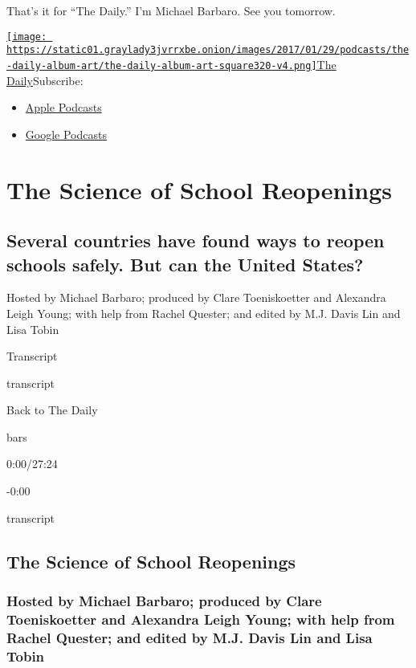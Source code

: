 That's it for ``The Daily.'' I'm Michael Barbaro. See you tomorrow.

\href{https://www.nytimes3xbfgragh.onion/column/the-daily}{\texttt{[image: https://static01.graylady3jvrrxbe.onion/images/2017/01/29/podcasts/the-daily-album-art/the-daily-album-art-square320-v4.png]}The
Daily}Subscribe:

\begin{itemize}
\tightlist
\item
  \href{https://itunes.apple.com/us/podcast/id1200361736}{Apple
  Podcasts}
\item
  \href{https://www.google.com/podcasts?feed=aHR0cHM6Ly9yc3MuYXJ0MTkuY29tL3RoZS1kYWlseQ\%3D\%3D}{Google
  Podcasts}
\end{itemize}

\hypertarget{the-science-of-school-reopenings-1}{%
\section{The Science of School
Reopenings}\label{the-science-of-school-reopenings-1}}

\hypertarget{several-countries-have-found-ways-to-reopen-schools-safely-but-can-the-united-states-1}{%
\subsection{Several countries have found ways to reopen schools safely.
But can the United
States?}\label{several-countries-have-found-ways-to-reopen-schools-safely-but-can-the-united-states-1}}

Hosted by Michael Barbaro; produced by Clare Toeniskoetter and Alexandra
Leigh Young; with help from Rachel Quester; and edited by M.J. Davis Lin
and Lisa Tobin

Transcript

transcript

Back to The Daily

bars

0:00/27:24

-0:00

transcript

\hypertarget{the-science-of-school-reopenings-2}{%
\subsection{The Science of School
Reopenings}\label{the-science-of-school-reopenings-2}}

\hypertarget{hosted-by-michael-barbaro-produced-by-clare-toeniskoetter-and-alexandra-leigh-young-with-help-from-rachel-quester-and-edited-by-mj-davis-lin-and-lisa-tobin-1}{%
\subsubsection{Hosted by Michael Barbaro; produced by Clare
Toeniskoetter and Alexandra Leigh Young; with help from Rachel Quester;
and edited by M.J. Davis Lin and Lisa
Tobin}\label{hosted-by-michael-barbaro-produced-by-clare-toeniskoetter-and-alexandra-leigh-young-with-help-from-rachel-quester-and-edited-by-mj-davis-lin-and-lisa-tobin-1}}

